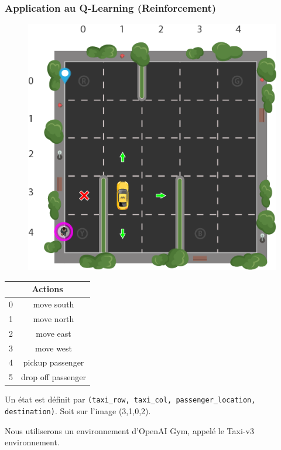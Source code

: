 \begin{frame}[fragile]
\frametitle{Application au Q-Learning (Reinforcement)}
\begin{figure}
\vspace{-0.5cm}
  \begin{center}
    \includegraphics[width=0.9\linewidth]{img/qlearning}
  \end{center}
\end{figure}


\begin{tabular}{|c|c|}
\hline
\multicolumn{2}{|c|}{Actions}\\
\hline
0 & move south \\
\hline
1 & move north \\
\hline
2 & move east \\
\hline
3 & move west \\
\hline
4 & pickup passenger \\
\hline
5 & drop off passenger\\
\hline
\end{tabular}

Un état est définit par \verb?(taxi_row, taxi_col, passenger_location, destination)?. Soit sur l'image (3,1,0,2).


Nous utiliserons un environnement d'OpenAI Gym, appelé le Taxi-v3 environnement.
\end{frame}

